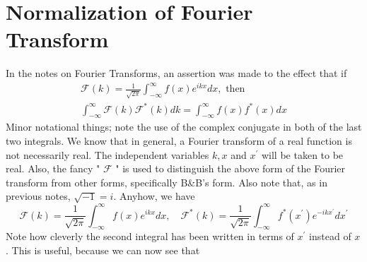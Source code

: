 \documentclass[main.tex]{subfiles}
\begin{document}
\section{Normalization of Fourier Transform}
In the notes on Fourier Transforms, an assertion was made to the effect that if
$$
\begin{gathered}
\mathcal{F}(k)=\frac{1}{\sqrt{2 \pi}} \int_{-\infty}^{\infty} f(x) e^{i k x} d x, \text { then } \\
\int_{-\infty}^{\infty} \mathcal{F}(k) \mathcal{F}^*(k) d k=\int_{-\infty}^{\infty} f(x) f^*(x) d x
\end{gathered}
$$
Minor notational things; note the use of the complex conjugate in both of the last two integrals. We know that in general, a Fourier transform of a real function is not necessarily real. The independent variables $k, x$ and $x^{\prime}$ will be taken to be real. Also, the fancy " $\mathcal{F}$ " is used to distinguish the above form of the Fourier transform from other forms, specifically B\&B's form. Also note that, as in previous notes, $\sqrt{-1}=i$. Anyhow, we have
$$
\mathcal{F}(k)=\frac{1}{\sqrt{2 \pi}} \int_{-\infty}^{\infty} f(x) e^{i k x} d x, \quad \mathcal{F}^*(k)=\frac{1}{\sqrt{2 \pi}} \int_{-\infty}^{\infty} f^*\left(x^{\prime}\right) e^{-i k x^{\prime}} d x^{\prime}
$$
Note how cleverly the second integral has been written in terms of $x^{\prime}$ instead of $x$.
This is useful, because we can now see that
\end{document}
